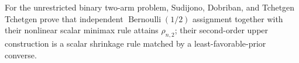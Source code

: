 For the unrestricted binary two-arm problem, Sudijono, Dobriban, and Tchetgen Tchetgen prove that independent \(\operatorname{Bernoulli}(1/2)\) assignment together with their nonlinear scalar minimax rule attains \(\rho_{n,2}\); their second-order upper construction is a scalar shrinkage rule matched by a least-favorable-prior converse.